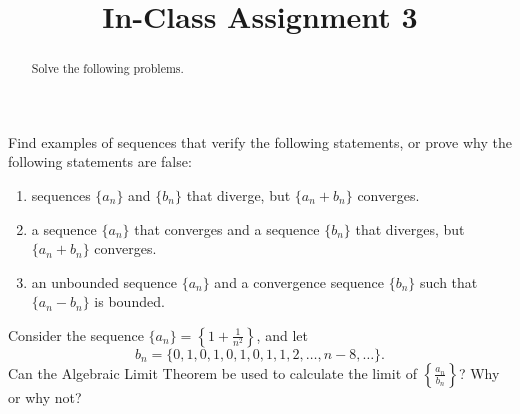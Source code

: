 \documentclass{ximera}
\begin{document}
    \title{In-Class Assignment 3}
    \begin{abstract} Solve the following problems. \end{abstract}
    \maketitle

\begin{exercise}
	Find examples of sequences that verify the following statements, or prove why the following statements are false:
\begin{enumerate}
	\item sequences $\{a_n\}$ and $\{b_n\}$ that diverge, but $\{a_n+b_n\}$ converges.
	\item a sequence $\{a_n\}$ that converges and a sequence $\{b_n\}$ that diverges, but $\{a_n+b_n\}$ converges.
	\item an unbounded sequence $\{a_n\}$ and a convergence sequence $\{b_n\}$ such that $\{a_n-b_n\}$ is bounded.
\end{enumerate}
\end{exercise}
\newpage
\begin{exercise}
	Consider the sequence $\{a_n\} = \left\{1+\frac{1}{n^2}\right\}$, and let \[b_n = \{0,1,0,1,0,1,0,1,1, 2, \ldots , n-8, \ldots\}.\] Can the Algebraic Limit Theorem be used to calculate the limit of $\left\{\frac{a_n}{b_n}\right\}$?  Why or why not?
\end{exercise}
\end{document}
